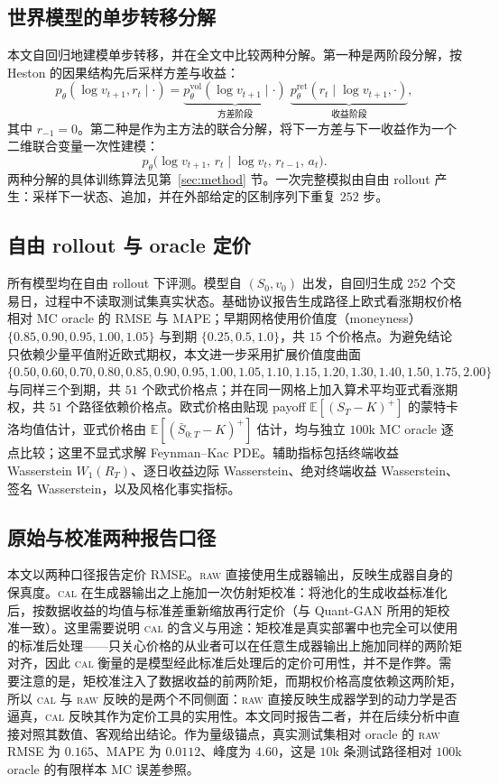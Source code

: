 \documentclass[11pt]{ctexart}
\newcommand{\raw}{\textsc{raw}}
\newcommand{\caltext}{\textsc{cal}}
\begin{document}
\subsection{世界模型的单步转移分解}
本文自回归地建模单步转移，并在全文中比较两种分解。第一种是两阶段分解，按 Heston 的因果结构先后采样方差与收益：
\begin{equation}
p_\theta(\log v_{t+1},r_t\mid\cdot)
= \underbrace{p^{\mathrm{vol}}_\theta(\log v_{t+1}\mid \cdot)}_{\text{方差阶段}}\;
  \underbrace{p^{\mathrm{ret}}_\theta(r_t\mid \log v_{t+1},\cdot)}_{\text{收益阶段}},
\end{equation}
其中 $r_{-1}=0$。第二种是作为主方法的联合分解，将下一方差与下一收益作为一个二维联合变量一次性建模：
\begin{equation}
p_\theta\big(\log v_{t+1},\,r_t \mid \log v_t,\,r_{t-1},\,a_t\big).
\end{equation}
两种分解的具体训练算法见第~\ref{sec:method} 节。一次完整模拟由自由 rollout 产生：采样下一状态、追加，并在外部给定的区制序列下重复 $252$ 步。

\subsection{自由 rollout 与 oracle 定价}
\label{sec:eval}
所有模型均在自由 rollout 下评测。模型自 $(S_0,v_0)$ 出发，自回归生成 $252$ 个交易日，过程中不读取测试集真实状态。基础协议报告生成路径上欧式看涨期权价格相对 MC oracle 的 RMSE 与 MAPE；早期网格使用价值度（moneyness）$\{0.85,0.90,0.95,1.00,1.05\}$ 与到期 $\{0.25,0.5,1.0\}$，共 $15$ 个价格点。为避免结论只依赖少量平值附近欧式期权，本文进一步采用扩展价值度曲面 $\{0.50,0.60,0.70,0.80,0.85,0.90,0.95,1.00,1.05,1.10,1.15,1.20,1.30,1.40,1.50,1.75,2.00\}$ 与同样三个到期，共 $51$ 个欧式价格点；并在同一网格上加入算术平均亚式看涨期权，共 $51$ 个路径依赖价格点。欧式价格由贴现 payoff $\mathbb E[(S_T-K)^+]$ 的蒙特卡洛均值估计，亚式价格由 $\mathbb E[(\bar S_{0:T}-K)^+]$ 估计，均与独立 $100$k MC oracle 逐点比较；这里不显式求解 Feynman--Kac PDE。辅助指标包括终端收益 Wasserstein $W_1(R_T)$、逐日收益边际 Wasserstein、绝对终端收益 Wasserstein、签名 Wasserstein，以及风格化事实指标。

\subsection{原始与校准两种报告口径}
\label{sec:rawcal}
本文以两种口径报告定价 RMSE。\raw{} 直接使用生成器输出，反映生成器自身的保真度。\caltext{} 在生成器输出之上施加一次仿射矩校准：将池化的生成收益标准化后，按数据收益的均值与标准差重新缩放再行定价（与 Quant-GAN 所用的矩校准一致）。这里需要说明 \caltext{} 的含义与用途：矩校准是真实部署中也完全可以使用的标准后处理——只关心价格的从业者可以在任意生成器输出上施加同样的两阶矩对齐，因此 \caltext{} 衡量的是模型经此标准后处理后的定价可用性，并不是作弊。需要注意的是，矩校准注入了数据收益的前两阶矩，而期权价格高度依赖这两阶矩，所以 \caltext{} 与 \raw{} 反映的是两个不同侧面：\raw{} 直接反映生成器学到的动力学是否逼真，\caltext{} 反映其作为定价工具的实用性。本文同时报告二者，并在后续分析中直接对照其数值、客观给出结论。作为量级锚点，真实测试集相对 oracle 的 \raw{} RMSE 为 $0.165$、MAPE 为 $0.0112$、峰度为 $4.60$，这是 $10$k 条测试路径相对 $100$k oracle 的有限样本 MC 误差参照。
\end{document}
